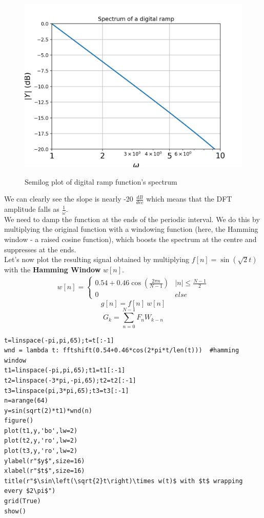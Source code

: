 \documentclass[11pt, a4paper]{article}
\begin{document}
\begin{figure}[H]
   	\centering
   	\includegraphics[scale=0.5]{ex_1_bode.png}
   	\label{fig:ex_1_bode}
   	\caption{Semilog plot of digital ramp function's spectrum}
\end{figure}
{
We can clearly see the slope is nearly -20 $\frac{dB}{dec}$ which means that the DFT amplitude falls as $\frac{1}{\omega}$.
\\We need to damp the function at the ends of the periodic interval. We do this by multiplying the original function with a windowing function (here, the Hamming window - a raised cosine function), which boosts the spectrum at the centre and suppresses at the ends.
\\Let's now plot the resulting signal obtained by multiplying  $f[n] = \sin(\sqrt{2} t)$ with the \textbf{Hamming Window} $w[n]$.
}
\begin{align*}
w[n] = \begin{cases}
 			0.54 + 0.46 \cos(\frac{2\pi n}{N-1}) & |n| \leq \frac{N-1}{2}  \\
 			 0  & else
		  \end{cases}
\end{align*}
\[
g[n] = f[n]\ w[n]
\]
\[
G_k = \sum_{n = 0}^{N - 1} F_n W_{k-n}
\]
\begin{verbatim}
t=linspace(-pi,pi,65);t=t[:-1]
wnd = lambda t: fftshift(0.54+0.46*cos(2*pi*t/len(t)))  #hamming window
t1=linspace(-pi,pi,65);t1=t1[:-1]
t2=linspace(-3*pi,-pi,65);t2=t2[:-1]
t3=linspace(pi,3*pi,65);t3=t3[:-1]
n=arange(64)
y=sin(sqrt(2)*t1)*wnd(n)
figure()
plot(t1,y,'bo',lw=2)
plot(t2,y,'ro',lw=2)
plot(t3,y,'ro',lw=2)
ylabel(r"$y$",size=16)
xlabel(r"$t$",size=16)
title(r"$\sin\left(\sqrt{2}t\right)\times w(t)$ with $t$ wrapping every $2\pi$")
grid(True)
show()
\end{verbatim}
\end{document}
